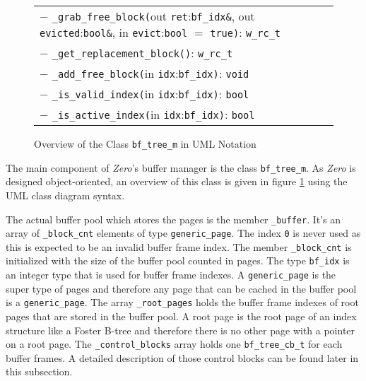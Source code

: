 \begin{@empty}
\begin{figure}[ht!]
{\begin{tabularx}{\textwidth}{|X|}
			$-$ \texttt{\_grab\_free\_block(}out \texttt{ret}:\texttt{bf\_idx\&}, out \texttt{evicted}:\texttt{bool\&}, in \texttt{evict}:\texttt{bool} $=$ \texttt{true)}: \texttt{w\_rc\_t}								\\
			$-$ \texttt{\_get\_replacement\_block()}: \texttt{w\_rc\_t}																											\\
			$-$ \texttt{\_add\_free\_block(}in \texttt{idx}:\texttt{bf\_idx)}: \texttt{void}																								\\
			$-$ \texttt{\_is\_valid\_index(}in \texttt{idx}:\texttt{bf\_idx)}: \texttt{bool}																								\\
			$-$ \texttt{\_is\_active\_index(}in \texttt{idx}:\texttt{bf\_idx)}: \texttt{bool}																								\\	\hline
		\end{tabularx}}
        \vspace{.5em}
		\caption{Overview of the Class \lstinline{bf_tree_m} in UML Notation}
		\label{fig:bufferdesign}
	\end{figure}
\end{@empty}

	The main component of \emph{Zero}'s buffer manager is the class \lstinline{bf_tree_m}. As \emph{Zero} is designed object-oriented, an overview of this class is given in figure \ref{fig:bufferdesign} using the UML class diagram syntax. 

	The actual buffer pool which stores the pages is the member \lstinline{_buffer}. It's an array of \lstinline{_block_cnt} elements of type \lstinline{generic_page}. The index \lstinline{0} is never used as this is expected to be an invalid buffer frame index. The member \lstinline{_block_cnt} is initialized with the size of the buffer pool counted in pages. The type \lstinline{bf_idx} is an integer type that is used for buffer frame indexes. A \lstinline{generic_page} is the super type of pages and therefore any page that can be cached in the buffer pool is a \lstinline{generic_page}. The array \lstinline{_root_pages} holds the buffer frame indexes of root pages that are stored in the buffer pool. A root page is the root page of an index structure like a Foster B-tree and therefore there is no other page with a pointer on a root page. The \lstinline{_control_blocks} array holds one \lstinline{bf_tree_cb_t} for each buffer frames. A detailed description of those control blocks can be found later in this subsection.

